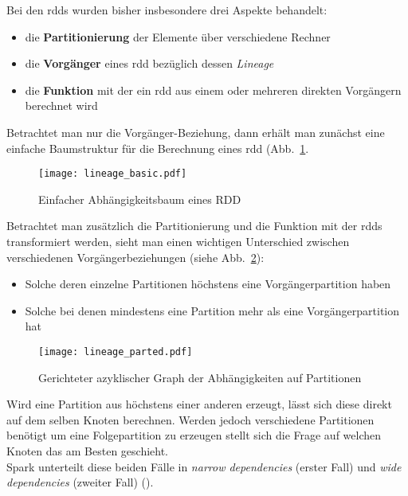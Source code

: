 Bei den \glspl{rdd} wurden bisher insbesondere drei Aspekte behandelt:
\begin{itemize}
	\item die \textbf{Partitionierung} der Elemente über verschiedene Rechner
	\item die \textbf{Vorgänger} eines \gls{rdd} bezüglich dessen \textit{Lineage}
	\item die \textbf{Funktion} mit der ein \gls{rdd} aus einem oder mehreren direkten Vorgängern berechnet wird
\end{itemize}

Betrachtet man nur die Vorgänger-Beziehung, dann erhält man zunächst eine einfache Baumstruktur für die Berechnung eines \gls{rdd} (Abb.~\ref{fig:lineage_basic}.\\

\begin{figure}[ht!]
	\centering
  \texttt{[image: lineage\_basic.pdf]}
	\caption{Einfacher Abhängigkeitsbaum eines RDD}
	\label{fig:lineage_basic}
\end{figure}

Betrachtet man zusätzlich die Partitionierung und die Funktion mit der \glspl{rdd} transformiert werden, sieht man einen wichtigen Unterschied zwischen verschiedenen Vorgängerbeziehungen (siehe Abb.~\ref{fig:lineage_parted}):
\begin{itemize}
\item Solche deren einzelne Partitionen höchstens eine Vorgängerpartition haben
\item Solche bei denen mindestens eine Partition mehr als eine Vorgängerpartition hat
\end{itemize}

\begin{figure}[ht!]
	\centering
  \texttt{[image: lineage\_parted.pdf]}
	\caption{Gerichteter azyklischer Graph der Abhängigkeiten auf Partitionen}
	\label{fig:lineage_parted}
\end{figure}

Wird eine Partition aus höchstens einer anderen erzeugt, lässt sich diese direkt auf dem selben Knoten berechnen. Werden jedoch verschiedene Partitionen benötigt um eine Folgepartition zu erzeugen stellt sich die Frage auf welchen Knoten das am Besten geschieht.\\
Spark unterteilt diese beiden Fälle in \textit{narrow dependencies} (erster Fall) und \textit{wide dependencies} (zweiter Fall) (\cite{Mat12}).\\

